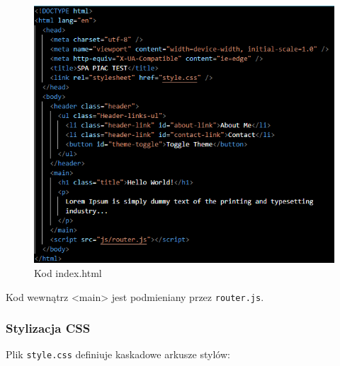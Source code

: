 \documentclass[a4paper,12pt]{article}
\begin{document}
\begin{figure}[H]
    \centering
    \includegraphics[width=1\textwidth]{images/index_html.png}
    \caption{Kod index.html}
\end{figure}

Kod wewnątrz <main> jest podmieniany przez \texttt{router.js}.

\subsubsection{Stylizacja CSS}
Plik \texttt{style.css} definiuje kaskadowe arkusze stylów:
\end{document}
